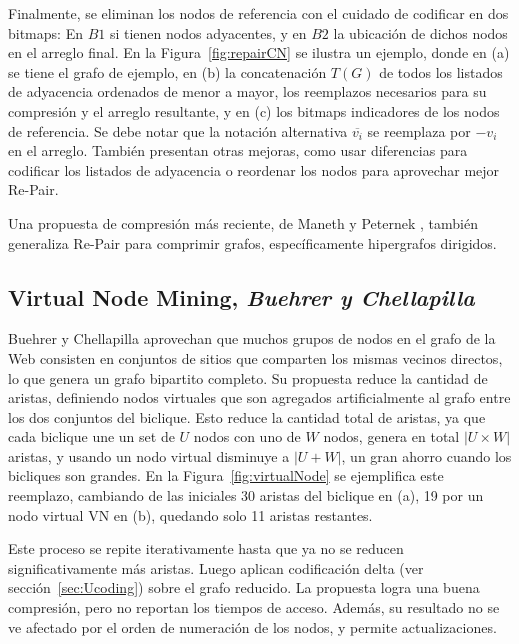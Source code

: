Finalmente, se eliminan los nodos de referencia con el cuidado de codificar en dos bitmaps: En $B1$ si tienen nodos adyacentes, y en $B2$ la ubicación de dichos nodos en el arreglo final. En la Figura~\ref{fig:repairCN} se ilustra un ejemplo, donde en (a) se tiene el grafo de ejemplo, en (b) la concatenación $T(G)$ de todos los listados de adyacencia ordenados de menor a mayor, los reemplazos necesarios para su compresión y el arreglo resultante, y en (c) los bitmaps indicadores de los nodos de referencia. Se debe notar que la notación alternativa $\overline{v_{i}}$ se reemplaza por $-v_{i}$ en el arreglo. También presentan otras mejoras, como usar diferencias para codificar los listados de adyacencia o reordenar los nodos para aprovechar mejor Re-Pair.



Una propuesta de compresión más reciente, de Maneth y Peternek \cite{maneth2016compressing}, también generaliza Re-Pair para comprimir grafos, específicamente hipergrafos dirigidos.


\subsection{Virtual Node Mining, \textit{Buehrer y Chellapilla}}
Buehrer y Chellapilla \cite{BuehrerChellapilla} aprovechan que muchos grupos de nodos en el grafo de la Web consisten en conjuntos de sitios que comparten los mismas vecinos directos, lo que genera un grafo bipartito completo. Su propuesta reduce la cantidad de aristas, definiendo nodos virtuales que son agregados artificialmente al grafo entre los dos conjuntos del biclique. Esto reduce la cantidad total de aristas, ya que cada biclique une un set de $U$ nodos con uno de $W$ nodos, genera en total $|U \times W|$ aristas, y usando un nodo virtual disminuye a $|U + W|$, un gran ahorro cuando los bicliques son grandes. En la Figura~\ref{fig:virtualNode} se ejemplifica este reemplazo, cambiando de las iniciales 30 aristas del biclique en (a), 19 por un nodo virtual VN en (b), quedando solo 11 aristas restantes.



Este proceso se repite iterativamente hasta que ya no se reducen significativamente más aristas. Luego aplican codificación delta (ver sección~\ref{sec:Ucoding}) sobre el grafo reducido. La propuesta logra una buena compresión, pero no reportan los tiempos de acceso. Además, su resultado no se ve afectado por el orden de numeración de los nodos, y permite actualizaciones.

